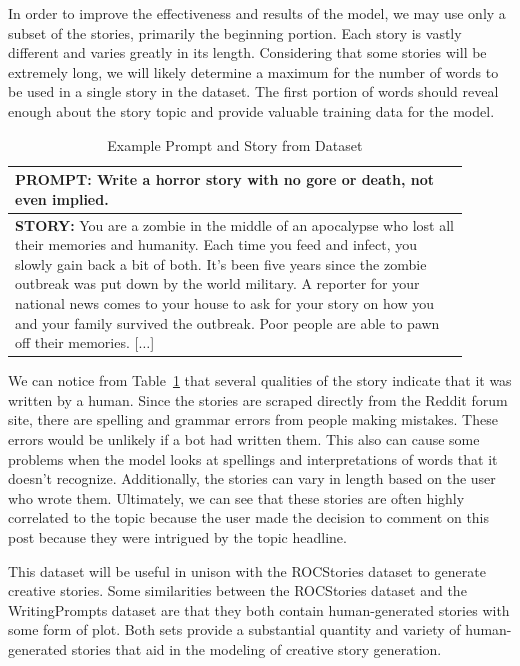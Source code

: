 \documentclass[letterpaper]{article}
\begin{document}
In order to improve the effectiveness and results of the model, we may use only a subset of the stories, primarily the beginning portion. Each story is vastly different and varies greatly in its length. Considering that some stories will be extremely long, we will likely determine a maximum for the number of words to be used in a single story in the dataset. The first portion of words should reveal enough about the story topic and provide valuable training data for the model. 

\begin{table}[htbp]
\centering
\begin{tabular}{p{0.9\linewidth}}
\hline
\noindent \textbf{PROMPT:} Write a horror story with no gore or death, not even implied. \\
\hline
\noindent \textbf{STORY:} You are a zombie in the middle of an apocalypse who lost all their memories and humanity. Each time you feed and infect, you slowly gain back a bit of both. It's been five years since the zombie outbreak was put down by the world military. A reporter for your national news comes to your house to ask for your story on how you and your family survived the outbreak. Poor people are able to pawn off their memories. [$\dots$] \\
\hline
\end{tabular}
\caption{Example Prompt and Story from Dataset}
\label{table:example}
\end{table}

We can notice from Table~\ref{table:example} that several qualities of the story indicate that it was written by a human. Since the stories are scraped directly from the Reddit forum site, there are spelling and grammar errors from people making mistakes. These errors would be unlikely if a bot had written them. This also can cause some problems when the model looks at spellings and interpretations of words that it doesn't recognize. Additionally, the stories can vary in length based on the user who wrote them. Ultimately, we can see that these stories are often highly correlated to the topic because the user made the decision to comment on this post because they were intrigued by the topic headline.

This dataset will be useful in unison with the ROCStories dataset to generate creative stories. Some similarities between the ROCStories dataset and the WritingPrompts dataset are that they both contain human-generated stories with some form of plot. Both sets provide a substantial quantity and variety of human-generated stories that aid in the modeling of creative story generation. 
\end{document}
